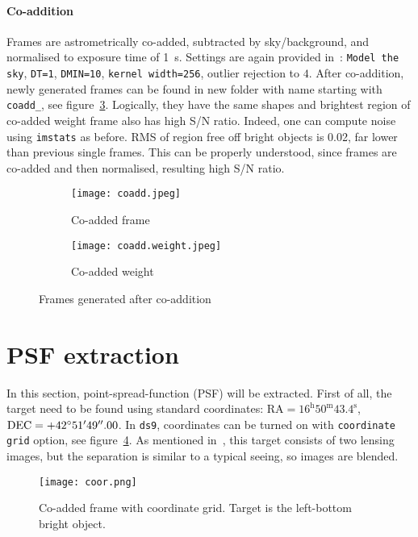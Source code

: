 \paragraph{Co-addition} 
Frames are astrometrically co-added, subtracted by sky/background, and normalised to exposure time of \SI{1}{\second}.  Settings are again provided in~\cite{manual}: \verb|Model the sky|, \verb|DT=1|, \verb|DMIN=10|, \verb|kernel width=256|, outlier rejection to $4$. After co-addition, newly generated frames can be found in new folder with name starting with \verb|coadd_|, see figure~\ref{fig:coadds}. Logically, they have the same shapes and brightest region of co-added weight frame also has high S/N ratio. Indeed, one can compute noise using \verb|imstats| as before. RMS of region free off bright objects is \num{0.02}, far lower than previous single frames. This can be properly understood, since frames are co-added and then normalised, resulting high S/N ratio.
\begin{figure}[h]
   \centering
   \begin{subfigure}[t]{0.8\textwidth}
   \begin{center}
   \texttt{[image: coadd.jpeg]}
   \end{center}
   \caption{Co-added frame}
   \label{fig:coadd}
   \end{subfigure}
   \begin{subfigure}[t]{0.8\textwidth}
   \begin{center}
   \texttt{[image: coadd.weight.jpeg]}
   \end{center}
   \caption{Co-added weight}
   \label{fig:coadd-weight}
   \end{subfigure}
   \caption{Frames generated after co-addition}%
   \label{fig:coadds}
\end{figure}

\clearpage
\section{PSF extraction}
In this section, point-spread-function (PSF) will be extracted. First of all, the target need to be found using standard coordinates: $\text{RA} = 16^\text{h}50^\text{m}43.4^\text{s}$, $\text{DEC}=+42\degree 51'49''.00$. In \verb|ds9|, coordinates can be turned on with \verb|coordinate grid| option, see figure~\ref{fig:coor-grid}. As mentioned in~\cite{manual}, this target consists of two lensing images, but the separation is similar to a typical seeing, so images are blended.
\begin{figure}[ht]
   \centering
   \texttt{[image: coor.png]}
   \caption{Co-added frame with coordinate grid. Target is the left-bottom bright object.}%
   \label{fig:coor-grid}
\end{figure}

